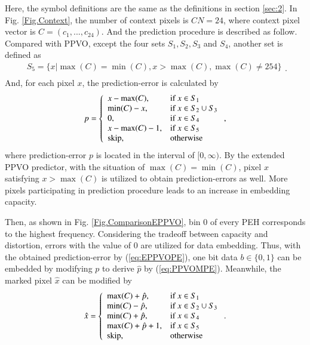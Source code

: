 \documentclass[review,3p,10pt,sort&compress]{elsarticle}
\begin{document}
Here, the symbol definitions are the same as the definitions in section \ref{sec:2}. In Fig. \ref{Fig.Context}, the number of context pixels is $CN = 24$, where context pixel vector is $C = (c_{1}, ..., c_{24})$. And the prediction procedure is described as follow. Compared with PPVO, except the four sets $S_1, S_2, S_3$ and $S_4$, another set is defined as
\begin{equation*}\label{eq:S_5}
\begin{array}{ll}
S_5 = \{ x | \max(C)   =  \min(C), x > \max(C), \max(C)   \neq  254 \} \\
\end{array}.
\end{equation*}
And, for each pixel $x$, the prediction-error is calculated by
\begin{equation}\label{eq:EPPVOPE}
p = \left\{\begin{array}{ll}
x - \max(C),    & \text{if } x \in S_1  \\
\min(C) - x,    & \text{if } x \in S_2 \cup S_3 \\
0,              & \text{if } x \in S_4 \\
x - \max(C) - 1,& \text{if } x \in S_5  \\
{\rm skip},     & \text{otherwise}
\end{array}\right.,
\end{equation}
where prediction-error $p$ is located in the interval of $[0, \infty)$. By the extended PPVO predictor, with the situation of $\max(C) = \min(C)$, pixel $x$ satisfying $x > \max(C)$ is utilized to obtain prediction-errors as well. More pixels participating in prediction procedure leads to an increase in embedding capacity.

Then, as shown in Fig. \ref{Fig.ComparisonEPPVO}, bin $0$ of every PEH corresponds to the highest frequency. Considering the tradeoff between capacity and distortion, errors with the value of $0$ are utilized for data embedding. Thus, with the obtained prediction-error by (\ref{eq:EPPVOPE}), one bit data $b \in \{0, 1\}$ can be embedded by modifying $p$ to derive $\hat{p}$ by (\ref{eq:PPVOMPE}). Meanwhile, the marked pixel $\hat{x}$ can be modified by
\begin{equation}\label{eq:Embed}
\hat{x} = \left\{\begin{array}{ll}
\max(C) + \hat{p},    & \text{if } x \in S_1\\
\min(C) - \hat{p},    & \text{if } x \in S_2 \cup S_3 \\
\min(C) + \hat{p},    & \text{if } x \in S_4 \\
\max(C) + \hat{p} + 1,& \text{if } x \in S_5  \\
{\rm skip},     & \text{otherwise}
\end{array}\right..
\end{equation}
\end{document}
